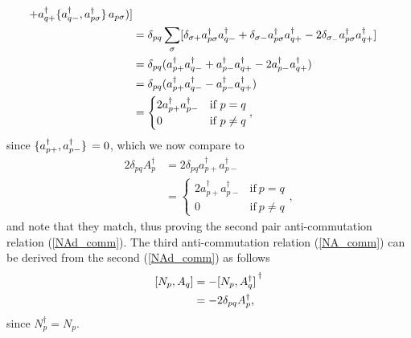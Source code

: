 \documentclass[Dual]{msu-thesis}
\begin{document}
\begin{appendices}
\begin{align}
+
a^\dagger_{q+}\acomm*{a^\dagger_{q-}}{a^\dagger_{p\sigma}}a_{p\sigma}
)
]
\\
&=
\delta_{pq}\sum_\sigma 
[
\delta_{\sigma+}a^\dagger_{p\sigma}a^\dagger_{q-}
+
\delta_{\sigma-}a^\dagger_{p\sigma}a^\dagger_{q+}
-2
\delta_{\sigma_-}
a^\dagger_{p\sigma}a^\dagger_{q+}
]
\\
&=
\delta_{pq}
(
a^\dagger_{p+}a^\dagger_{q-}
+
a^\dagger_{p-}a^\dagger_{q+}
-2
a^\dagger_{p-}a^\dagger_{q+}
)
\\
&=
\delta_{pq}
(
a^\dagger_{p+}a^\dagger_{q-}
-
a^\dagger_{p-}a^\dagger_{q+}
)
\\
&=
\begin{cases}
2a^\dagger_{p+}a^\dagger_{p-} & \text{if} \ p=q
\\
0 & \text{if} \ p\neq q
\end{cases},
\end{align}
since $\acomm*{a^\dagger_{p+}}{a^\dagger_{p-}}=0$, which we now compare to
\begin{align}
2\delta_{pq}A^\dagger_p
&=
2\delta_{pq}a^\dagger_{p+}a^\dagger_{p-}
\\
&=
\begin{cases}
2a^\dagger_{p+}a^\dagger_{p-} & \text{if} \ p=q
\\
0 & \text{if} \ p\neq q
\end{cases},
\end{align}
and note that they match, thus proving the second pair anti-commutation relation (\ref{NAd_comm}). The third anti-commutation relation (\ref{NA_comm}) can be derived from the second (\ref{NAd_comm}) as follows
\begin{align}
\comm{N_p}{A_q}
&=
-\comm*{N_p}{A^\dagger_q}^\dagger
\\
&=
-2\delta_{pq}A^\dagger_p,
\end{align}
since $N_p^\dagger=N_p$. 

\end{appendices}

\backmatter
%
%
\makebibliographypage
%
\SingleSpacing
%

\printbibliography

\end{document}

